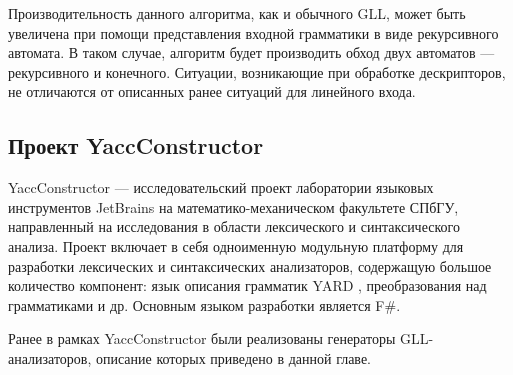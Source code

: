 Производительность данного алгоритма, как и обычного GLL, может быть увеличена при помощи представления входной грамматики в виде рекурсивного автомата. В таком случае, алгоритм будет производить обход двух автоматов --- рекурсивного и конечного. Ситуации, возникающие при обработке дескрипторов, не отличаются от описанных ранее ситуаций для линейного входа. 

\subsection{Проект YaccConstructor}

YaccConstructor \cite{SemyonPhD} --- исследовательский проект лаборатории языковых инструментов JetBrains на математико-механическом факультете СПбГУ, направленный на исследования в области лексического и синтаксического анализа. Проект включает в себя одноименную модульную платформу для разработки лексических и синтаксических анализаторов, содержащую большое количество компонент: язык описания грамматик YARD \cite{yard_url}, преобразования над грамматиками и др. Основным языком разработки является F$\#$.

Ранее в рамках YaccConstructor были реализованы генераторы GLL-анализаторов, описание которых приведено в данной главе. 
